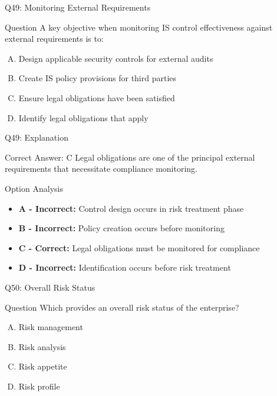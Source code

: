 \documentclass{beamer}
\begin{document}
	\begin{frame}{Q49: Monitoring External Requirements}
		\begin{block}{Question}
			A key objective when monitoring IS control effectiveness against external requirements is to:
		\end{block}
		\begin{enumerate}[(A)]
			\item Design applicable security controls for external audits
			\item Create IS policy provisions for third parties
			\item Ensure legal obligations have been satisfied
			\item Identify legal obligations that apply
		\end{enumerate}
	\end{frame}
	
	\begin{frame}{Q49: Explanation}
		\begin{block}{Correct Answer: C}
			Legal obligations are one of the principal external requirements that necessitate compliance monitoring.
		\end{block}
		\begin{block}{Option Analysis}
			\begin{itemize}
				\item \textbf{A - Incorrect:} Control design occurs in risk treatment phase
				\item \textbf{B - Incorrect:} Policy creation occurs before monitoring
				\item \textbf{C - Correct:} Legal obligations must be monitored for compliance
				\item \textbf{D - Incorrect:} Identification occurs before risk treatment
			\end{itemize}
		\end{block}
	\end{frame}
	
	\begin{frame}{Q50: Overall Risk Status}
		\begin{block}{Question}
			Which provides an overall risk status of the enterprise?
		\end{block}
		\begin{enumerate}[(A)]
			\item Risk management
			\item Risk analysis
			\item Risk appetite
			\item Risk profile
		\end{enumerate}
	\end{frame}
	
\end{document}
